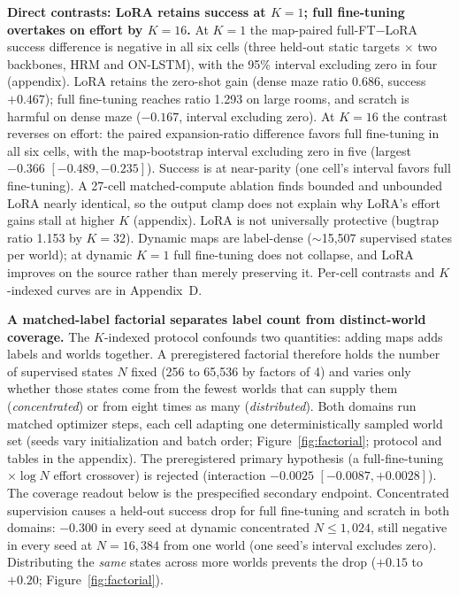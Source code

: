 \documentclass[letterpaper]{article} %
\begin{document}
\textbf{Direct contrasts: LoRA retains success at $K{=}1$; full fine-tuning overtakes on effort by $K{=}16$.} At $K{=}1$ the map-paired full-FT$-$LoRA success difference is negative in all six cells (three held-out static targets $\times$ two backbones, HRM and ON-LSTM), with the 95\% interval excluding zero in four (appendix). LoRA retains the zero-shot gain (dense maze ratio 0.686, success $+0.467$); full fine-tuning reaches ratio 1.293 on large rooms, and scratch is harmful on dense maze ($-0.167$, interval excluding zero). At $K{=}16$ the contrast reverses on effort: the paired expansion-ratio difference favors full fine-tuning in all six cells, with the map-bootstrap interval excluding zero in five (largest $-0.366$ $[-0.489,-0.235]$). Success is at near-parity (one cell's interval favors full fine-tuning). A 27-cell matched-compute ablation finds bounded and unbounded LoRA nearly identical, so the output clamp does not explain why LoRA's effort gains stall at higher $K$ (appendix). LoRA is not universally protective (bugtrap ratio 1.153 by $K{=}32$). Dynamic maps are label-dense ($\sim$15{,}507 supervised states per world); at dynamic $K{=}1$ full fine-tuning does not collapse, and LoRA improves on the source rather than merely preserving it. Per-cell contrasts and $K$-indexed curves are in Appendix~D.

\textbf{A matched-label factorial separates label count from distinct-world coverage.} The $K$-indexed protocol confounds two quantities: adding maps adds labels and worlds together. A preregistered factorial therefore holds the number of supervised states $N$ fixed (256 to 65{,}536 by factors of 4) and varies only whether those states come from the fewest worlds that can supply them (\emph{concentrated}) or from eight times as many (\emph{distributed}). Both domains run matched optimizer steps, each cell adapting one deterministically sampled world set (seeds vary initialization and batch order; Figure~\ref{fig:factorial}; protocol and tables in the appendix). The preregistered primary hypothesis (a full-fine-tuning$\times\log N$ effort crossover) is rejected (interaction $-0.0025$ $[-0.0087, +0.0028]$). The coverage readout below is the prespecified secondary endpoint. Concentrated supervision causes a held-out success drop for full fine-tuning and scratch in both domains: $-0.300$ in every seed at dynamic concentrated $N \leq 1{,}024$, still negative in every seed at $N{=}16{,}384$ from one world (one seed's interval excludes zero). Distributing the \emph{same} states across more worlds prevents the drop ($+0.15$ to $+0.20$; Figure~\ref{fig:factorial}).
\end{document}

